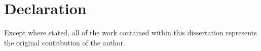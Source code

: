 
\chapter*{Declaration}

\begin{list}{}{%
  \setlength{\leftmargin}{2cm}%
  \setlength{\rightmargin}{2cm}%
}\item[]
Except where stated, all of the work contained within this dissertation represents the original contribution of the author.




\end{list}

